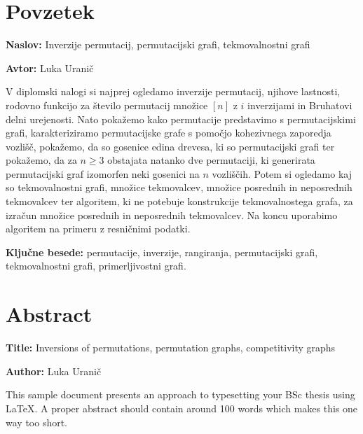 \documentclass[a4paper, 12pt]{book}
\newcommand{\ttitle}{Inverzije permutacij, permutacijski grafi, tekmovalnostni grafi}
\newcommand{\ttitleEn}{Inversions of permutations, permutation graphs, competitivity graphs}
\newcommand{\tauthor}{Luka Uranič}
\newcommand{\tkeywords}{permutacije, inverzije, rangiranja, permutacijski grafi, tekmovalnostni grafi, primerljivostni grafi}
\newcommand{\clearemptydoublepage}{\newpage{\pagestyle{empty}\cleardoublepage}}
\begin{document}

\chapter*{Povzetek}

\noindent\textbf{Naslov:} \ttitle
\bigskip

\noindent\textbf{Avtor:} \tauthor
\bigskip

\noindent V diplomski nalogi si najprej ogledamo inverzije permutacij, njihove lastnosti, rodovno funkcijo za število permutacij množice $[n]$ z $i$ inverzijami in Bruhatovi delni urejenosti.
Nato pokažemo kako permutacije predstavimo s permutacijskimi grafi, karakteriziramo permutacijske grafe s pomočjo kohezivnega zaporedja vozlišč, pokažemo, da so gosenice edina drevesa, ki so permutacijski grafi ter pokažemo, da za $n \geq 3$ obstajata natanko dve permutaciji, ki generirata permutacijski graf izomorfen neki gosenici na $n$ vozliščih. Potem si ogledamo kaj so tekmovalnostni grafi, množice tekmovalcev, množice posrednih in neposrednih tekmovalcev ter algoritem, ki ne potebuje konstrukcije tekmovalnostega grafa, za izračun množice posrednih in neposrednih tekmovalcev. Na koncu uporabimo algoritem na primeru z resničnimi podatki.


\bigskip

\noindent\textbf{Ključne besede:} \tkeywords.
\clearemptydoublepage

\chapter*{Abstract}

\noindent\textbf{Title:} \ttitleEn
\bigskip

\noindent\textbf{Author:} \tauthor
\bigskip

\noindent This sample document presents an approach to typesetting your BSc thesis using \LaTeX. 
A proper abstract should contain around 100 words which makes this one way too short.
\bigskip
\end{document}
